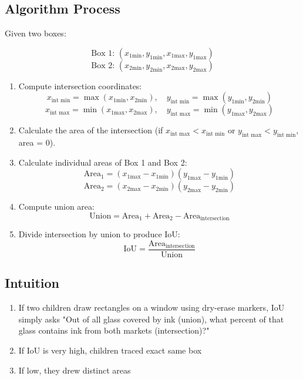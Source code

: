 \documentclass[12pt]{article}
\begin{document}
\subsection{Algorithm Process}

Given two boxes:

\[
    \text{Box 1: } (x_{1\text{min}}, y_{1\text{min}}, x_{1\text{max}}, y_{1\text{max}})
\]
\[
    \text{Box 2: } (x_{2\text{min}}, y_{2\text{min}}, x_{2\text{max}}, y_{2\text{max}})
\]

\begin{enumerate}
    \item Compute intersection coordinates:
          \[
              x_{\text{int min}} = \max(x_{1\text{min}}, x_{2\text{min}}), \quad
              y_{\text{int min}} = \max(y_{1\text{min}}, y_{2\text{min}})
          \]
          \[
              x_{\text{int max}} = \min(x_{1\text{max}}, x_{2\text{max}}), \quad
              y_{\text{int max}} = \min(y_{1\text{max}}, y_{2\text{max}})
          \]
    \item Calculate the area of the intersection (if $x_{\text{int max}} < x_{\text{int min}}$ or $y_{\text{int max}} < y_{\text{int min}}$, area = 0).
    \item Calculate individual areas of Box 1 and Box 2:
          \[
              \text{Area}_1 = (x_{1\text{max}} - x_{1\text{min}})(y_{1\text{max}} - y_{1\text{min}})
          \]
          \[
              \text{Area}_2 = (x_{2\text{max}} - x_{2\text{min}})(y_{2\text{max}} - y_{2\text{min}})
          \]
    \item Compute union area:
          \[
              \text{Union} = \text{Area}_1 + \text{Area}_2 - \text{Area}_{\text{intersection}}
          \]
    \item Divide intersection by union to produce IoU:
          \[
              \text{IoU} = \frac{\text{Area}_{\text{intersection}}}{\text{Union}}
          \]
\end{enumerate}

\subsection{Intuition}
\begin{enumerate}
    \item If two children draw rectangles on a window using dry-erase markers, IoU simply asks "Out of all glass covered by ink (union), what percent of that glass contains ink from both markets (intersection)?"
    \item If IoU is very high, children traced exact same box
    \item If low, they drew distinct areas
\end{enumerate}
\end{document}
